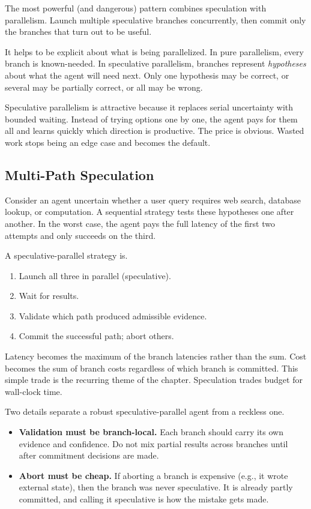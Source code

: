 The most powerful (and dangerous) pattern combines speculation with parallelism. Launch multiple speculative branches concurrently, then commit only the branches that turn out to be useful.

It helps to be explicit about what is being parallelized. In pure parallelism, every branch is known-needed. In speculative parallelism, branches represent \emph{hypotheses} about what the agent will need next. Only one hypothesis may be correct, or several may be partially correct, or all may be wrong.

Speculative parallelism is attractive because it replaces serial uncertainty with bounded waiting. Instead of trying options one by one, the agent pays for them all and learns quickly which direction is productive. The price is obvious. Wasted work stops being an edge case and becomes the default.

\subsection{Multi-Path Speculation}

Consider an agent uncertain whether a user query requires web search, database lookup, or computation. A sequential strategy tests these hypotheses one after another. In the worst case, the agent pays the full latency of the first two attempts and only succeeds on the third.

A speculative-parallel strategy is.

\begin{enumerate}
\item Launch all three in parallel (speculative).
\item Wait for results.
\item Validate which path produced admissible evidence.
\item Commit the successful path; abort others.
\end{enumerate}

Latency becomes the maximum of the branch latencies rather than the sum. Cost becomes the sum of branch costs regardless of which branch is committed. This simple trade is the recurring theme of the chapter. Speculation trades budget for wall-clock time.

Two details separate a robust speculative-parallel agent from a reckless one.

\begin{itemize}
\item \textbf{Validation must be branch-local.} Each branch should carry its own evidence and confidence. Do not mix partial results across branches until after commitment decisions are made.
\item \textbf{Abort must be cheap.} If aborting a branch is expensive (e.g., it wrote external state), then the branch was never speculative. It is already partly committed, and calling it speculative is how the mistake gets made.
\end{itemize}

